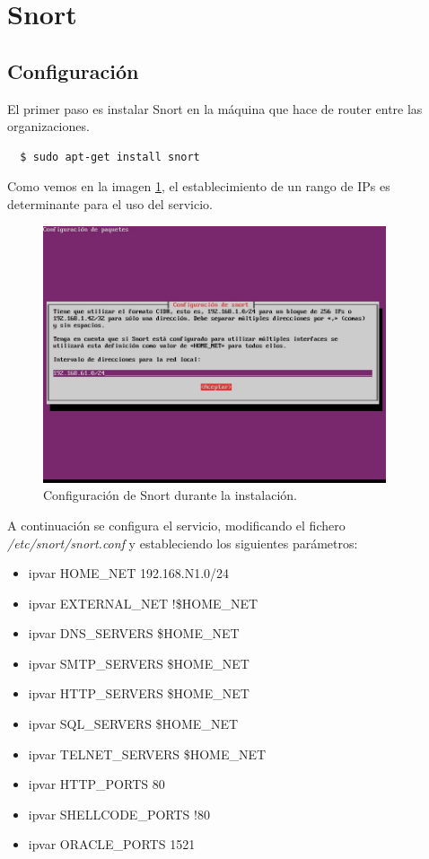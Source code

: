 \documentclass[a4,12pt,onecolum]{article}
\begin{document}
\clearpage
\section{Snort}

\subsection{Configuración}

El primer paso es instalar Snort en la máquina que hace de router entre las organizaciones.

\begin{verbatim}
  $ sudo apt-get install snort
\end{verbatim}

Como vemos en la imagen \ref{fig:snort1}, el establecimiento de un rango de IPs es determinante para el uso del servicio.

\begin{figure}[htbp]
\centering
\includegraphics[width=0.9\textwidth]{./images/SnortInstalacion.jpg}
\caption{Configuración de Snort durante la instalación.}
\label{fig:snort1}
\end{figure}

A continuación se configura el servicio, modificando el fichero \emph{/etc/snort/snort.conf} y estableciendo los siguientes parámetros:

\begin{itemize}
  \item ipvar HOME\_NET 192.168.N1.0/24
  \item ipvar EXTERNAL\_NET !\$HOME\_NET
  \item ipvar DNS\_SERVERS \$HOME\_NET
  \item ipvar SMTP\_SERVERS    \$HOME\_NET
  \item ipvar HTTP\_SERVERS    \$HOME\_NET
  \item ipvar SQL\_SERVERS     \$HOME\_NET
  \item ipvar TELNET\_SERVERS  \$HOME\_NET
  \item ipvar HTTP\_PORTS      80
  \item ipvar SHELLCODE\_PORTS !80
  \item ipvar ORACLE\_PORTS    1521
\end{itemize}
\end{document}
